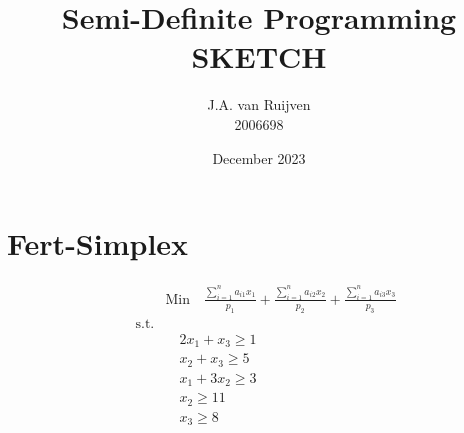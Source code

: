 \documentclass{article}
\title{Semi-Definite Programming SKETCH}
\author{J.A. van Ruijven \\ 2006698 }
\date{December 2023}
\begin{document}
\maketitle
\section{Fert-Simplex} 
\begin{align}
	& \text{Min} \quad
	 \frac{\sum_{i=1}^{n}a_{i1}x_1}{p_1} +
	 \frac{\sum_{i=1}^{n}a_{i2}x_2}{p_2} +
	 \frac{\sum_{i=1}^{n}a_{i3}x_3}{p_3} \\
	  \quad \text{s.t.} \\
	& \quad 2x_1 + x_3 \geq 1 \\
	& \quad x_2 + x_3 \geq 5 \\
	& \quad x_1 + 3x_2 \geq 3 \\
	& \quad x_2 \geq 11 \\
 	& \quad x_3 \geq 8 \\
\end{align}
\label{eq:Fert-Simplex minimization}
\end{document}
